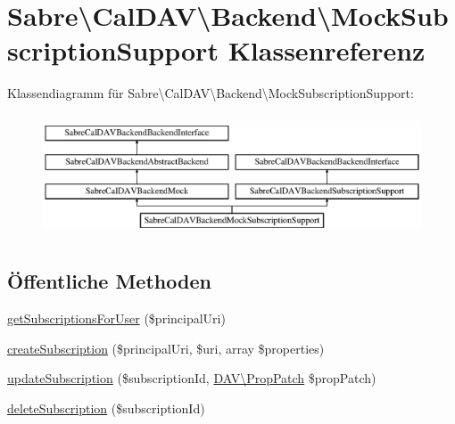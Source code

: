 \hypertarget{class_sabre_1_1_cal_d_a_v_1_1_backend_1_1_mock_subscription_support}{}\section{Sabre\textbackslash{}Cal\+D\+AV\textbackslash{}Backend\textbackslash{}Mock\+Subscription\+Support Klassenreferenz}
\label{class_sabre_1_1_cal_d_a_v_1_1_backend_1_1_mock_subscription_support}
Klassendiagramm für Sabre\textbackslash{}Cal\+D\+AV\textbackslash{}Backend\textbackslash{}Mock\+Subscription\+Support\+:\begin{figure}[H]
\begin{center}
\leavevmode
\includegraphics[height=3.660131cm]{class_sabre_1_1_cal_d_a_v_1_1_backend_1_1_mock_subscription_support}
\end{center}
\end{figure}
\subsection*{Öffentliche Methoden}
\begin{DoxyCompactItemize}
\item 
\mbox{\hyperlink{class_sabre_1_1_cal_d_a_v_1_1_backend_1_1_mock_subscription_support_a6586395148ea71f7d9bf101f8b9ee517}{get\+Subscriptions\+For\+User}} (\$principal\+Uri)
\item 
\mbox{\hyperlink{class_sabre_1_1_cal_d_a_v_1_1_backend_1_1_mock_subscription_support_aa8c4a1d6cdef00c3191810599cfb1e7d}{create\+Subscription}} (\$principal\+Uri, \$uri, array \$properties)
\item 
\mbox{\hyperlink{class_sabre_1_1_cal_d_a_v_1_1_backend_1_1_mock_subscription_support_a3ca7bea943b42a3bf2118ef745f41d31}{update\+Subscription}} (\$subscription\+Id, \mbox{\hyperlink{class_sabre_1_1_d_a_v_1_1_prop_patch}{D\+A\+V\textbackslash{}\+Prop\+Patch}} \$prop\+Patch)
\item 
\mbox{\hyperlink{class_sabre_1_1_cal_d_a_v_1_1_backend_1_1_mock_subscription_support_a5172791acb23c4690d2991a86e898e9f}{delete\+Subscription}} (\$subscription\+Id)
\end{DoxyCompactItemize}
